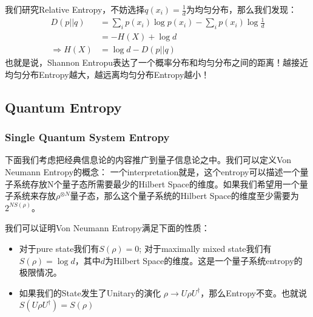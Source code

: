   我们研究Relative Entropy，不妨选择$ q(x_i) = \frac{1}{d} $为均匀分布，那么我们发现：
  \begin{align}
    D(p||q) &= \sum_i p(x_i) \log p(x_i) - \sum_i p(x_i) \log \frac{1}{d} \\
    &= -H(X) + \log d \\
    \Rightarrow H(X) &= \log d - D(p||q)
  \end{align}
  也就是说，Shannon Entropu表达了一个概率分布和均匀分布之间的距离！越接近均匀分布Entropy越大，越远离均匀分布Entropy越小！


  \subsection{Quantum Entropy}

  \subsubsection{Single Quantum System Entropy}

  \bigskip

  下面我们考虑把经典信息论的内容推广到量子信息论之中。我们可以定义Von Neumann Entropy的概念：
  一个interpretation就是，这个entropy可以描述一个量子系统存放N个量子态所需要最少的Hilbert
  Space的维度。如果我们希望用一个量子系统来存放$ \rho^{\otimes N} $量子态，那么这个量子系统的Hilbert
  Space的维度至少需要为$ 2^{N S(\rho)} $。

  \bigskip

  我们可以证明Von Neumann Entropy满足下面的性质：
  \begin{itemize}
    \item 对于pure state我们有$ S(\rho) = 0 $; 对于maximally mixed state我们有$
      S(\rho) = \log d $，其中$ d $为Hilbert Space的维度。这是一个量子系统entropy的极限情况。
    \item 如果我们的State发生了Unitary的演化 $ \rho \to U \rho U^\dagger
      $，那么Entropy不变。也就说$ S(U \rho U^\dagger) = S(\rho) $
  \end{itemize}

